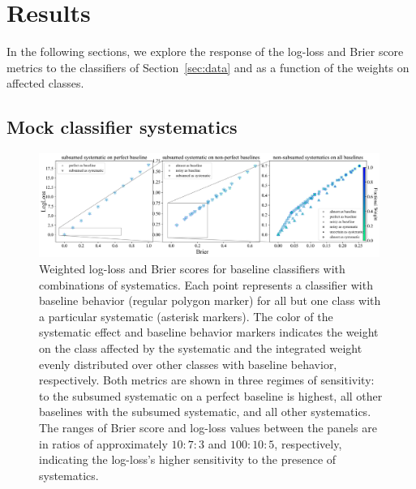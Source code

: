\section{Results}
\label{sec:results}

In the following sections, we explore the response of the log-loss and Brier score metrics to the classifiers of Section~\ref{sec:data} and as a function of the weights on affected classes.

\subsection{Mock classifier systematics}
\label{sec:mockresults}

\begin{figure}
	\begin{center}
		\includegraphics[width=0.99\textwidth]{./fig/multipanel_res.png}
		\caption{Weighted log-loss and Brier scores for baseline classifiers with combinations of systematics.
		Each point represents a classifier with baseline behavior (regular polygon marker) for all but one class with a particular systematic (asterisk markers).
		The color of the systematic effect and baseline behavior markers indicates the weight on the class affected by the systematic and the integrated weight evenly distributed over other classes with baseline behavior, respectively.
		Both metrics are shown in three regimes of sensitivity: to the subsumed systematic on a perfect baseline is highest, all other baselines with the subsumed systematic, and all other systematics.
		The ranges of Brier score and log-loss values between the panels are in ratios of approximately $10:7:3$ and $100:10:5$, respectively, indicating the log-loss's higher sensitivity to the presence of systematics.
		}
	\end{center}
	\label{fig:all_combined}
\end{figure}

